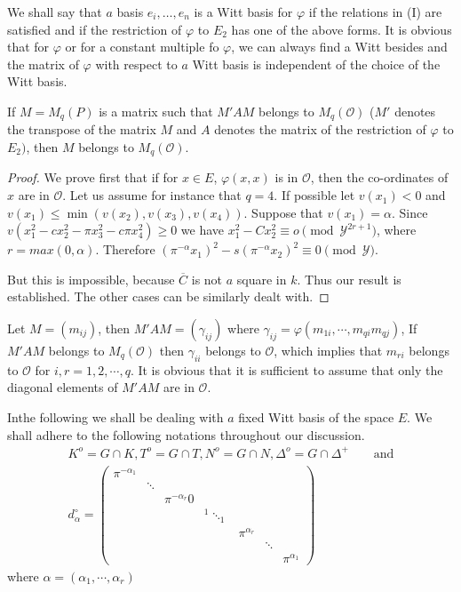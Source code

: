 We shall say that $a$ basis $e_i,\ldots, e_n$ is a Witt basis for
$\varphi$ if the relations in (I) are satisfied and if the restriction
of $\varphi$ to $E_2$ has one of the above forms. It is obvious that
for $\varphi$ or for a constant
multiple fo $\varphi$, we can always find a Witt besides and the
matrix of $\varphi$ with respect to $a$  Witt basis is independent of
the choice of  the Witt basis.  

\begin{proposition}\label{part2:chap2:sec3:coro4}
  If $M=M_q(P) $ is a matrix such that $M' AM$ belongs to $M_q
  (\mathscr{O})$  ($M'$ denotes the transpose of the matrix $M$ and
  $A$  denotes the matrix of the restriction of $ \varphi$ to $E_2)$, 
  then $M$ belongs to $ M_q (\mathscr{O})$.   
\end{proposition}

\begin{proof}
  We prove first that if for $ x \in E$, $\varphi(x,x)$ is in
  $\mathscr{O}$, then 
  the co-ordinates of $x$ are in $\mathscr{O}$. Let us assume for
  instance that $q=4$.  If possible let $ v(x_1) < 0 $ and  $
  v(x_1)\leq \min (v(x_2), v(x_3), v(x_4))$. Suppose that $ v(x_1)=
  \alpha $.  Since $ v(x_1^2 -c x_2 ^2- \pi x_3^2 - c \pi x_4^2) \ge 0$
  we have $ x_1^2 - Cx_2^2 \equiv o \pmod {\mathscr{Y}^{2r+1}} $, where
  $ r= max (0,\alpha)$. Therefore  $(\pi^{- \alpha }x_1)^2 - s(\pi
  ^{- \alpha }x_2)^2  \equiv 0 \pmod {\mathscr{Y}}$. 
  
  But  this is impossible, because $ \overline {C}$  is not $a$ square
  in $k$. Thus our result is established. The other cases can be
  similarly dealt with.  
\end{proof}

Let $M=(m_{ij})$, then $M' A M = (\gamma_{ij}) $ where  $ \gamma_{ij}
= \varphi (m_{1i}, \cdots, m_{qi } m_{qj})$, If $M' A M$ belongs to 
$M_q(\mathscr{O})$ then $\gamma _{ii}$ belongs to $ \mathscr{O}$,
which implies that $ m_{ri}$ belongs to $ \mathscr{O}$ for $ i, r =
1,2,\cdots,  q$. It is obvious that  it is sufficient to
assume that only the diagonal elements of $M' A M $ are in
$\mathscr{O}$. 

In\pageoriginale the following we shall be dealing with $a$ fixed Witt basis of the
space $E$.  We shall adhere to the following notations throughout our
discussion. 
\begin{gather*}
  K^o = G \cap K, T^o = G \cap T, N^o = G \cap N, \Delta^o = G \cap
  \Delta^+\qquad \text{and}\\
d^\circ_\alpha=
\begin{pmatrix}
    \pi^{-\alpha_1}&&&&&& \\
    & \ddots &&&&&\\
    &&\pi^{-\alpha_r} 0& && &\\
    & & &{}^1 \ddots_1 & &&\\
    &&&& \pi^{\alpha_r} &&\\
    &&&&&\ddots &\\
    &&&&&& \pi^{\alpha_1}
  \end{pmatrix}
\end{gather*}
where $ \alpha  =( \alpha  _1,  \cdots, \alpha _r )$

